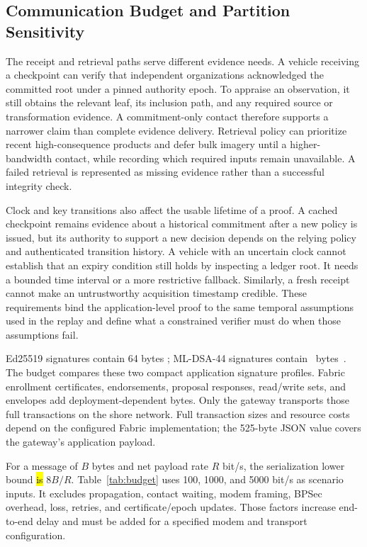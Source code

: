 \documentclass[blockchains,review,accept,moreauthors]{Definitions/mdpi}
\begin{document}
\subsection{Communication Budget and Partition Sensitivity}\label{sec:budget}

The receipt and retrieval paths serve different evidence needs. A vehicle receiving a checkpoint can verify that independent organizations acknowledged the committed root under a pinned authority epoch. To appraise an observation, it still obtains the relevant leaf, its inclusion path, and any required source or transformation evidence. A commitment-only contact therefore supports a narrower claim than complete evidence delivery. Retrieval policy can prioritize recent high-consequence products and defer bulk imagery until a higher-bandwidth contact, while recording which required inputs remain unavailable. A failed retrieval is represented as missing evidence rather than a successful integrity check.

Clock and key transitions also affect the usable lifetime of a proof. A cached checkpoint remains evidence about a historical commitment after a new policy is issued, but its authority to support a new decision depends on the relying policy and authenticated transition history. A vehicle with an uncertain clock cannot establish that an expiry condition still holds by inspecting a ledger root. It needs a bounded time interval or a more restrictive fallback. Similarly, a fresh receipt cannot make an untrustworthy acquisition timestamp credible. These requirements bind the application-level proof to the same temporal assumptions used in the replay and define what a constrained verifier must do when those assumptions fail.

Ed25519 signatures contain 64 bytes \citep{rfc8032}; ML-DSA-44 signatures contain ~bytes~\citep{fips204}. The budget compares these two compact application signature profiles. Fabric enrollment certificates, endorsements, proposal responses, read/write sets, and envelopes add deployment-dependent bytes. Only the gateway transports those full transactions on the shore network. Full transaction sizes and resource costs depend on the configured Fabric implementation; the 525-byte JSON value covers the gateway's application payload.

For a message of $B$ bytes and net payload rate $R$ bit/s, the serialization lower bound \hl{is} %
 $8B/R$. Table~\ref{tab:budget} uses 100, 1000, and 5000 bit/s as scenario inputs. It excludes propagation, contact waiting, modem framing, BPSec overhead, loss, retries, and certificate/epoch updates. Those factors increase end-to-end delay and must be added for a specified modem and transport configuration.
\end{document}
